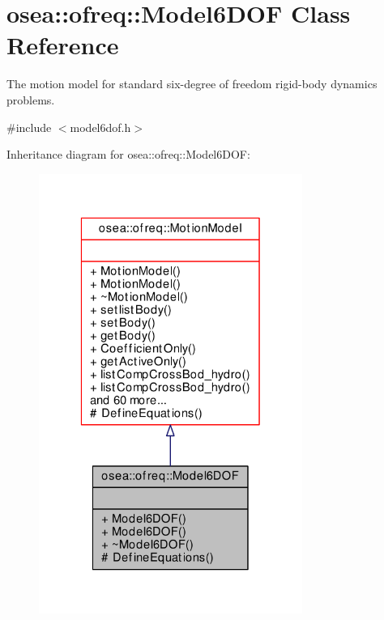 \hypertarget{classosea_1_1ofreq_1_1_model6_d_o_f}{\section{osea\-:\-:ofreq\-:\-:Model6\-D\-O\-F Class Reference}
\label{classosea_1_1ofreq_1_1_model6_d_o_f}
}


The motion model for standard six-\/degree of freedom rigid-\/body dynamics problems.  




{\ttfamily \#include $<$model6dof.\-h$>$}



Inheritance diagram for osea\-:\-:ofreq\-:\-:Model6\-D\-O\-F\-:
\nopagebreak
\begin{figure}[H]
\begin{center}
\leavevmode
\includegraphics[width=244pt]{classosea_1_1ofreq_1_1_model6_d_o_f__inherit__graph}
\end{center}
\end{figure}
